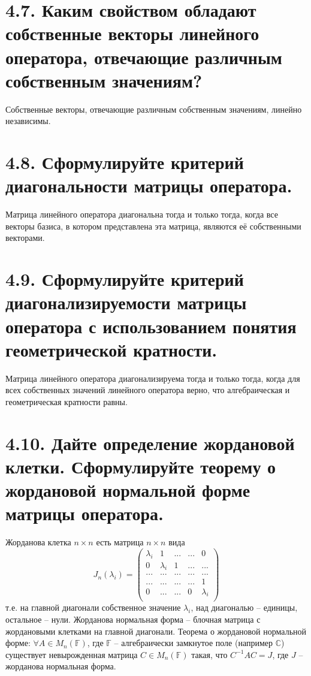 \documentclass{article}
\begin{document}
\section*{\LARGE 4.7. Каким свойством обладают собственные векторы линейного оператора, отвечающие различным собственным значениям?}
Собственные векторы, отвечающие различным собственным значениям, линейно независимы.

\section*{\LARGE 4.8. Сформулируйте критерий диагональности матрицы оператора.}
Матрица линейного оператора диагональна тогда и только тогда, когда все векторы базиса, в котором представлена эта матрица, являются её собственными векторами. 

\section*{\LARGE 4.9. Сформулируйте критерий диагонализируемости матрицы оператора с использованием понятия геометрической кратности.}
Матрица линейного оператора диагонализируема тогда и только тогда, когда для всех собственных значений линейного оператора верно, что алгебраическая и геометрическая кратности равны.

\section*{\LARGE 4.10. Дайте определение жордановой клетки. Сформулируйте теорему о жордановой нормальной форме матрицы оператора.}
Жорданова клетка $n\times n$ есть матрица $n\times n$ вида
$$
J_n(\lambda_i) = 
\begin{pmatrix}
\lambda_i & 1 & ... & ... & 0 \\
0 & \lambda_i& 1 & ... & ... \\
... & ... & ... & ... & ... \\
... & ... & ... & ... & 1 \\
0 & ... & ... & 0 & \lambda_i \\
\end{pmatrix}
$$
т.е. на главной диагонали собственное значение $\lambda_i$, над диагональю -- единицы, остальное -- нули.
\newline Жорданова нормальная форма -- блочная матрица с жордановыми клетками на главной диагонали.
\newline Теорема о жордановой нормальной форме: $\forall A \in M_n(\mathbb{F})$, где $\mathbb{F}$ -- алгебраически замкнутое поле (например $\mathbb{C}$) существует невырожденная матрица $C \in M_n(\mathbb{F})$ такая, что $C^{-1}AC = J$, где $J$ -- жорданова нормальная форма.
\end{document}
